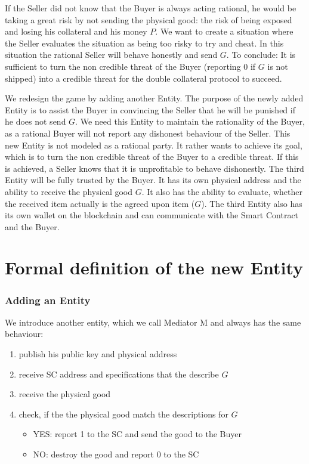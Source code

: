 \documentclass{cacthesis}
\begin{document}
If the Seller did not know that the Buyer is always acting rational, he would be taking a great risk by not sending the physical good: the risk of being exposed and losing his collateral and his money $P$.\newline
We want to create a situation where the Seller evaluates the situation as being too risky to try and cheat. In this situation the rational Seller will behave honestly and  send $G$.\newline
To conclude: It is sufficient to turn the non credible threat of the Buyer (reporting 0 if $G$ is not shipped) into a credible threat for the double collateral protocol to succeed.

We redesign the game by adding another Entity. The purpose of the newly added Entity is to assist the Buyer in convincing the Seller that he will be punished if he does not send $G$. We need this Entity to maintain the rationality of the Buyer, as a rational Buyer will not report any dishonest behaviour of the Seller.\newline
This new Entity is not modeled as a rational party. It rather wants to achieve its goal, which is to turn the non credible threat of the Buyer to a credible threat. If this is achieved, a Seller knows that it is unprofitable to behave dishonestly.\newline
The third Entity will be fully trusted by the Buyer. It has its own physical address and  the ability to receive the physical good $G$. It also has the ability to evaluate, whether the received item actually is the agreed upon item ($G$).\newline
The third Entity also has its own wallet on the blockchain and can communicate with the Smart Contract and the Buyer.

\section{Formal definition of the new Entity}
\subsubsection{Adding an Entity}
We introduce another entity, which we call Mediator M and always has the same behaviour:
\begin{enumerate}
    \item publish his public key and physical address
    \item receive SC address and specifications that the describe $G$
    \item receive the physical good
    \item check, if the the physical good match the descriptions for $G$
    \begin{itemize}
        \item YES: report 1 to the SC and send the good to the Buyer
        \item NO: destroy the good and report 0 to the SC
    \end{itemize}
\end{enumerate}
\end{document}
